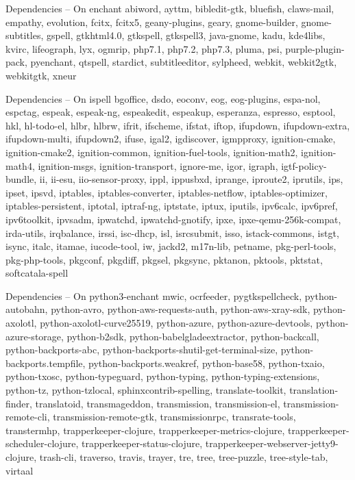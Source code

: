 \documentclass{beamer}
\begin{document}
\begin{frame}{Dependencies – On enchant}
abiword, ayttm, bibledit-gtk, bluefish, claws-mail, empathy, \alert{evolution}, fcitx, fcitx5, geany-plugins, geary, gnome-builder, gnome-subtitles, \alert{gspell}, gtkhtml4.0, \alert{gtkspell}, \alert{gtkspell3}, java-gnome, kadu, kde4libs, kvirc, lifeograph, lyx, ogmrip, php7.1, php7.2, php7.3, pluma, psi, purple-plugin-pack, \alert{pyenchant}, \alert{qtspell}, stardict, subtitleeditor, sylpheed, webkit, webkit2gtk, webkitgtk, xneur
\end{frame}

\begin{frame}{Dependencies – On ispell}
\small bgoffice, dsdo, eoconv, eog, eog-plugins, espa-nol, espctag, espeak, espeak-ng, espeakedit, espeakup, esperanza, espresso, esptool, hkl, hl-todo-el, hlbr, hlbrw, ifrit, ifscheme, ifstat, iftop, ifupdown, ifupdown-extra, ifupdown-multi, ifupdown2, ifuse, igal2, igdiscover, igmpproxy, ignition-cmake, ignition-cmake2, ignition-common, ignition-fuel-tools, ignition-math2, ignition-math4, ignition-msgs, ignition-transport, ignore-me, igor, igraph, igtf-policy-bundle, ii, ii-esu, iio-sensor-proxy, ippl, ippusbxd, iprange, iproute2, iprutils, ips, ipset, ipsvd, iptables, iptables-converter, iptables-netflow, iptables-optimizer, iptables-persistent, iptotal, iptraf-ng, iptstate, iptux, iputils, ipv6calc, ipv6pref, ipv6toolkit, ipvsadm, ipwatchd, ipwatchd-gnotify, ipxe, ipxe-qemu-256k-compat, irda-utils, irqbalance, irssi, isc-dhcp, isl, isrcsubmit, isso, istack-commons, istgt, isync, italc, itamae, iucode-tool, iw, jackd2, m17n-lib, petname, pkg-perl-tools, pkg-php-tools, pkgconf, pkgdiff, pkgsel, pkgsync, pktanon, pktools, pktstat, softcatala-spell
\end{frame}

\begin{frame}{Dependencies – On python3-enchant}
\small mwic, ocrfeeder, \alert{pygtkspellcheck}, python-autobahn, python-avro, python-aws-requests-auth, python-aws-xray-sdk, python-axolotl, python-axolotl-curve25519, python-azure, python-azure-devtools, python-azure-storage, python-b2sdk, python-babelgladeextractor, python-backcall, python-backports-abc, python-backports-shutil-get-terminal-size, python-backports.tempfile, python-backports.weakref, python-base58, python-txaio, python-txosc, python-typeguard, python-typing, python-typing-extensions, python-tz, python-tzlocal, sphinxcontrib-spelling, translate-toolkit, translation-finder, translatoid, transmageddon, transmission, transmission-el, transmission-remote-cli, transmission-remote-gtk, transmissionrpc, transrate-tools, transtermhp, trapperkeeper-clojure, trapperkeeper-metrics-clojure, trapperkeeper-scheduler-clojure, trapperkeeper-status-clojure, trapperkeeper-webserver-jetty9-clojure, trash-cli, traverso, travis, trayer, tre, tree, tree-puzzle, tree-style-tab, virtaal
\end{frame}
\end{document}

